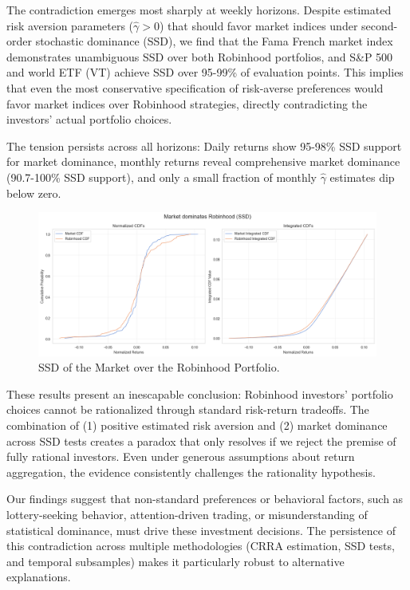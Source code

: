 The contradiction emerges most sharply at weekly horizons. 
Despite estimated risk aversion parameters ($\hat{\gamma} > 0$) that should favor market indices under second-order stochastic dominance (SSD), we find that the Fama French market index demonstrates unambiguous SSD over both Robinhood portfolios, 
and S\&P 500 and world ETF (VT) achieve SSD over 95-99\% of evaluation points.
This implies that even the most conservative specification of risk-averse preferences would favor market indices over Robinhood strategies, directly contradicting the investors' actual portfolio choices.

The tension persists across all horizons: Daily returns show 95-98\% SSD support for market dominance, monthly returns reveal comprehensive market dominance (90.7-100\% SSD support), and only a small fraction of monthly $\hat{\gamma}$ estimates dip below zero.

\begin{figure}[H]
    \centering
    \includegraphics[width=0.8\linewidth]{../images/risk/ssd_number_5d_mkt.png}
    \caption{SSD of the Market over the Robinhood Portfolio.}
    \label{fig:fsd_fedyk_mine}
\end{figure}    

These results present an inescapable conclusion: Robinhood investors' portfolio choices cannot be rationalized through standard risk-return tradeoffs. 
The combination of (1) positive estimated risk aversion and (2) market dominance across SSD tests creates a paradox that only resolves if we reject the premise of fully rational investors.
Even under generous assumptions about return aggregation, the evidence consistently challenges the rationality hypothesis.

Our findings suggest that non-standard preferences or behavioral factors, such as lottery-seeking behavior, attention-driven trading, or misunderstanding of statistical dominance, must drive these investment decisions. 
The persistence of this contradiction across multiple methodologies (CRRA estimation, SSD tests, and temporal subsamples) makes it particularly robust to alternative explanations.


